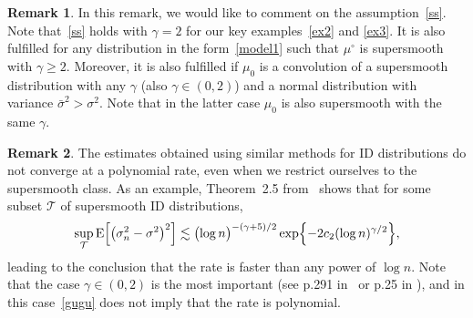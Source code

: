 \documentclass[a4paper,11pt]{article}
\theoremstyle{definition}
\newtheorem{remark}{Remark}
\newcommand{\1}{\mathbb{I}}
\newcommand{\T}{\mathcal{T}}
\newcommand{\E}{{\mathrm E}}
\theoremstyle{remark}
\begin{document}
\begin{remark} In this remark, we would like to  comment on the 
 assumption~\eqref{ss}. %
Note that~\eqref{ss} holds  with \(\gamma=2\)  for our key examples~\ref{ex2} and \ref{ex3}.  
It is also fulfilled for any distribution in the form~\eqref{model1} such that \(\mu^\circ\) is supersmooth with \(\gamma\geq2.\) Moreover, it is also fulfilled if \(\mu_0\) is a convolution of a supersmooth distribution with any \(\gamma\) (also \( \gamma \in (0,2)\)) and a normal distribution with variance \(\bar{\sigma}^2>\sigma^2\). Note that in the latter case  \(\mu_0\) is also supersmooth with the same \(\gamma.\)
\end{remark}
\begin{remark}The estimates obtained using similar methods  for ID distributions do not converge at a polynomial rate, even when we restrict ourselves to the supersmooth class. As an example, Theorem~2.5 from~\cite{Gugu} shows that for some subset \(\T\) of supersmooth ID distributions, 
\begin{eqnarray}\label{gugu}
\sup_{\T} \E\Bigl[
\bigl(\sigma_n^2 - \sigma^2 \bigr) ^2
\Bigr] \lesssim
\bigl( 
\log n
\bigr)^{-(\gamma+5)/2} \exp\Bigl\{
-2 c_2 ( \log n)^{\gamma/2}
\Bigr\},
\end{eqnarray}
leading to the conclusion that the rate is faster than any power of \(\log n.\) Note that the case \(\gamma\in(0,2)\) is the most important (see p.291 in~\cite{Gugu} or p.25 in  \cite{BT2008I}), and in this case~\eqref{gugu}  does not imply that the rate is polynomial.\end{remark}
\end{document}
